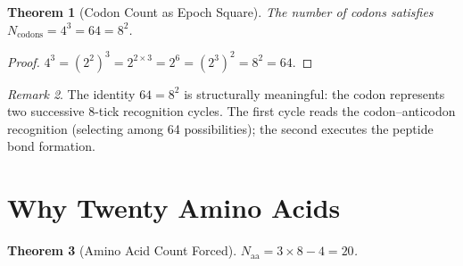 \documentclass[12pt,a4paper]{article}
\newtheorem{theorem}{Theorem}[section]
\theoremstyle{definition}
\theoremstyle{remark}
\newtheorem{remark}[theorem]{Remark}
\begin{document}
\begin{theorem}[Codon Count as Epoch Square]
\label{thm:codon-count}
The number of codons satisfies $N_{\mathrm{codons}} = 4^3 = 64 = 8^2$.
\end{theorem}

\begin{proof}
$4^3 = (2^2)^3 = 2^{2 \times 3} = 2^6 = (2^3)^2 = 8^2 = 64$.
\end{proof}

\begin{remark}
The identity $64 = 8^2$ is structurally meaningful: the codon represents
two successive 8-tick recognition cycles.  The first cycle reads the
codon--anticodon recognition (selecting among 64 possibilities); the
second executes the peptide bond formation.
\end{remark}

\section{Why Twenty Amino Acids}
\label{sec:twenty}

\begin{theorem}[Amino Acid Count Forced]
\label{thm:twenty}
$N_{\mathrm{aa}} = 3 \times 8 - 4 = 20$.
\end{theorem}
\end{document}
